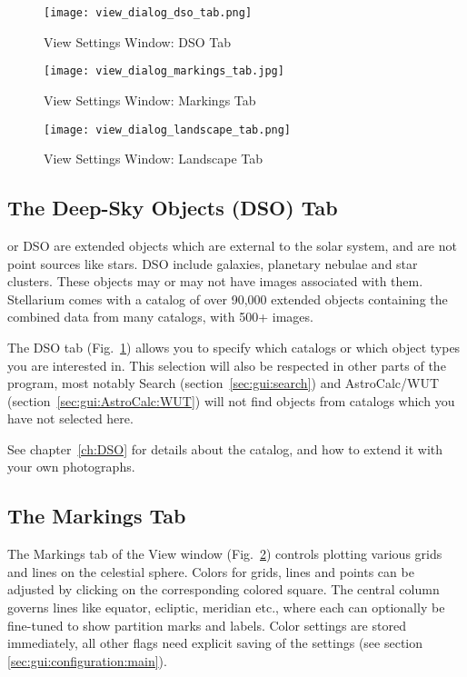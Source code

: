 \begin{figure}[p]
\centering\texttt{[image: view\_dialog\_dso\_tab.png]}
\caption{View Settings Window: DSO Tab}
\label{fig:gui:view:dso}
\end{figure}

\begin{figure}[p]
\centering\texttt{[image: view\_dialog\_markings\_tab.jpg]}
\caption{View Settings Window: Markings Tab}
\label{fig:gui:view:markings}
\end{figure}

\begin{figure}[p]
\centering\texttt{[image: view\_dialog\_landscape\_tab.png]}
\caption{View Settings Window: Landscape Tab}
\label{fig:gui:view:landscape}
\end{figure}

\subsection{The Deep-Sky Objects (DSO) Tab}
\label{sec:gui:view:dso}

 or DSO are extended objects which are
external to the solar system, and are not point sources like stars.
DSO include galaxies, planetary nebulae and star clusters. These
objects may or may not have images associated with them. Stellarium
comes with a catalog of over 90,000 extended objects containing
the combined data from many catalogs, with 500+ images.  

The DSO tab (Fig.~\ref{fig:gui:view:dso}) allows you to specify which 
catalogs or which object types you are interested in. This selection 
will also be respected in other parts of the program, 
most notably Search (section~\ref{sec:gui:search}) and 
AstroCalc/WUT (section~\ref{sec:gui:AstroCalc:WUT}) 
will not find objects from catalogs which you have not selected here. 

See chapter~\ref{ch:DSO} for details about the catalog, 
and how to extend it with your own photographs.


\subsection{The Markings Tab}
\label{sec:gui:view:markings}

\noindent The Markings tab of the View window
(Fig.~\ref{fig:gui:view:markings}) controls plotting various grids and
lines on the celestial sphere. Colors for grids, lines and points can be
adjusted by clicking on the corresponding colored square.  The central
column governs lines like equator, ecliptic, meridian etc., where each
can optionally be fine-tuned to  show partition
marks and labels. Color settings are stored immediately, all other
flags need explicit saving of the settings (see section
\ref{sec:gui:configuration:main}).

